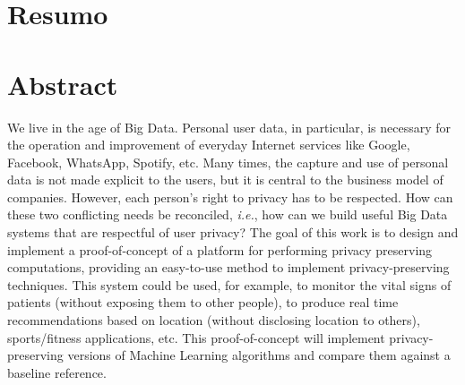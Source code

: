 %

\chapter*{Resumo} %
\thispagestyle{empty}



\newpage

\chapter*{Abstract} %
\thispagestyle{empty}

We live in the age of Big Data. Personal user data, in particular, is necessary for the operation and improvement of everyday Internet services like Google, Facebook, WhatsApp, Spotify, etc. Many times, the capture and use of personal data is not made explicit to the users, but it is central to the business model of companies. However, each person’s right to privacy has to be respected. How can these two conflicting needs be reconciled, \textit{i.e.}, how can we build useful Big Data systems that are respectful of user privacy?
The goal of this work is to design and implement a proof-of-concept of a platform for performing privacy preserving computations, providing an easy-to-use method to implement privacy-preserving techniques. This system could be used, for example, to monitor the vital signs of patients (without exposing them to other people), to produce real time recommendations based on location (without disclosing location to others), sports/fitness applications, etc.
This proof-of-concept will implement privacy-preserving versions of Machine Learning algorithms and compare them against a baseline reference. 

\newpage
